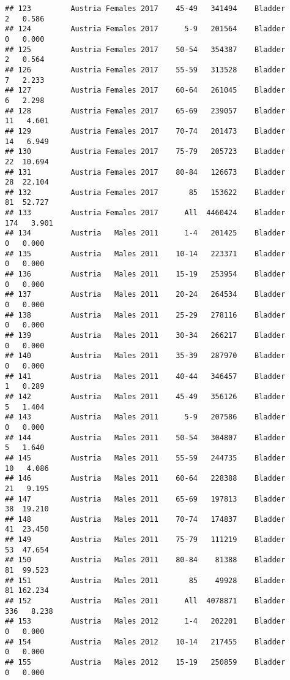 \documentclass[
]{article}
\begin{document}
\begin{verbatim}
## 123         Austria Females 2017    45-49   341494    Bladder      2   0.586
## 124         Austria Females 2017      5-9   201564    Bladder      0   0.000
## 125         Austria Females 2017    50-54   354387    Bladder      2   0.564
## 126         Austria Females 2017    55-59   313528    Bladder      7   2.233
## 127         Austria Females 2017    60-64   261045    Bladder      6   2.298
## 128         Austria Females 2017    65-69   239057    Bladder     11   4.601
## 129         Austria Females 2017    70-74   201473    Bladder     14   6.949
## 130         Austria Females 2017    75-79   205723    Bladder     22  10.694
## 131         Austria Females 2017    80-84   126673    Bladder     28  22.104
## 132         Austria Females 2017       85   153622    Bladder     81  52.727
## 133         Austria Females 2017      All  4460424    Bladder    174   3.901
## 134         Austria   Males 2011      1-4   201425    Bladder      0   0.000
## 135         Austria   Males 2011    10-14   223371    Bladder      0   0.000
## 136         Austria   Males 2011    15-19   253954    Bladder      0   0.000
## 137         Austria   Males 2011    20-24   264534    Bladder      0   0.000
## 138         Austria   Males 2011    25-29   278116    Bladder      0   0.000
## 139         Austria   Males 2011    30-34   266217    Bladder      0   0.000
## 140         Austria   Males 2011    35-39   287970    Bladder      0   0.000
## 141         Austria   Males 2011    40-44   346457    Bladder      1   0.289
## 142         Austria   Males 2011    45-49   356126    Bladder      5   1.404
## 143         Austria   Males 2011      5-9   207586    Bladder      0   0.000
## 144         Austria   Males 2011    50-54   304807    Bladder      5   1.640
## 145         Austria   Males 2011    55-59   244735    Bladder     10   4.086
## 146         Austria   Males 2011    60-64   228388    Bladder     21   9.195
## 147         Austria   Males 2011    65-69   197813    Bladder     38  19.210
## 148         Austria   Males 2011    70-74   174837    Bladder     41  23.450
## 149         Austria   Males 2011    75-79   111219    Bladder     53  47.654
## 150         Austria   Males 2011    80-84    81388    Bladder     81  99.523
## 151         Austria   Males 2011       85    49928    Bladder     81 162.234
## 152         Austria   Males 2011      All  4078871    Bladder    336   8.238
## 153         Austria   Males 2012      1-4   202201    Bladder      0   0.000
## 154         Austria   Males 2012    10-14   217455    Bladder      0   0.000
## 155         Austria   Males 2012    15-19   250859    Bladder      0   0.000

\end{verbatim}
\end{document}
